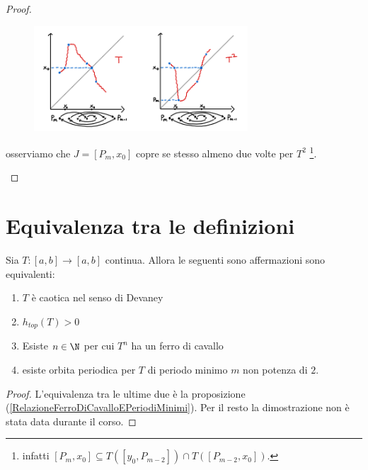 \begin{proof}
\begin{enumerate}
\begin{figure}[!htb]
	\centering
	\includegraphics[width=8cm]{Immagini/Ferro_cavallo_2.png}
\end{figure}

osserviamo che $J=[P_m,x_0]$ copre se stesso almeno due volte per $T^2$ \footnote{infatti $[P_m,x_0]\subseteq T([y_0,P_{m-2}])\cap T([P_{m-2},x_0])$.}.
\end{enumerate}
\setlength{\leftmargini}{0.5cm}
\end{proof}

\section*{Equivalenza tra le definizioni}
\begin{theorem}\label{CaratterizzazioneCaos}
Sia $T:[a,b]\to [a,b]$ continua. Allora le seguenti sono affermazioni sono equivalenti:
\begin{enumerate}
\item $T$ \`e caotica nel senso di Devaney
\item $h_{top}(T)>0$
\item Esiste $n\in\N$ per cui $T^n$ ha un ferro di cavallo
\item esiste orbita periodica per $T$ di periodo minimo $m$ non potenza di $2$.
\end{enumerate}
\end{theorem}
\begin{proof}
L'equivalenza tra le ultime due \`e la proposizione (\ref{RelazioneFerroDiCavalloEPeriodiMinimi}). Per il resto la dimostrazione non \`e stata data durante il corso.
\end{proof}

